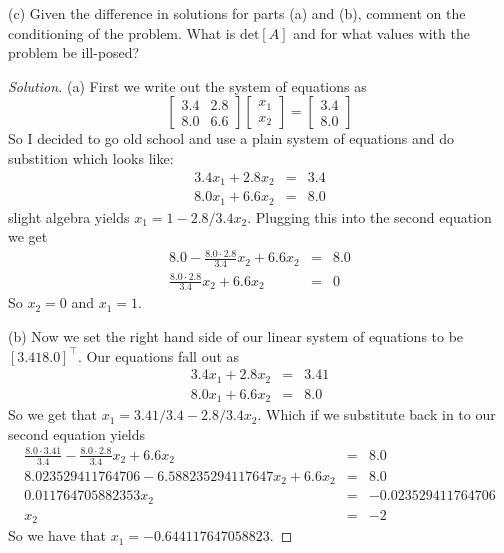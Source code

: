 \documentclass[12pt]{amsart}
\newenvironment{solution}
{\begin{proof}[Solution]}
{\end{proof}}
\begin{document}
\begin{onehalfspace}
        (c) Given the difference in solutions for parts (a) and (b), comment on the conditioning of the problem. What is
        $\text{det}[A]$ and for what values with the problem be ill-posed?
        \begin{solution}
            (a) First we write out the system of equations as
            \begin{displaymath}
                \left[\begin{matrix}
                          3.4 & 2.8 \\
                          8.0 & 6.6
                \end{matrix}\right]
                \left[\begin{matrix}
                          x_1 \\
                          x_2
                \end{matrix}\right] =
                \left[\begin{matrix}
                          3.4 \\
                          8.0
                \end{matrix}\right]
            \end{displaymath}
            So I decided to go old school and use a plain system of equations and do substition which looks like:
            \begin{eqnarray*}
                3.4x_1 + 2.8x_2 & = & 3.4 \\
                8.0x_1 + 6.6x_2 & = & 8.0
            \end{eqnarray*}
            slight algebra yields $x_1 = 1 - 2.8/3.4 x_2$. Plugging this into the second equation we get
            \begin{eqnarray*}
                8.0 - \frac{8.0\cdot 2.8}{3.4}x_2 + 6.6x_2  & = & 8.0 \\
                \frac{8.0\cdot 2.8}{3.4}x_2 + 6.6x_2 & = & 0
            \end{eqnarray*}
            So $x_2 = 0$ and $x_1 = 1$.

            (b) Now we set the right hand side of our linear system of equations to be $[3.41 8.0]^\top$. Our equations
            fall out as
            \begin{eqnarray*}
                3.4x_1 + 2.8x_2 & = & 3.41 \\
                8.0x_1 + 6.6x_2 & = & 8.0
            \end{eqnarray*}
            So we get that $x_1 = 3.41/3.4 - 2.8/3.4 x_2$. Which if we substitute back in to our second equation yields
            \begin{eqnarray*}
                \frac{8.0\cdot 3.41}{3.4} - \frac{8.0\cdot 2.8}{3.4}x_2 + 6.6x_2 & = & 8.0 \\
                8.023529411764706 - 6.588235294117647 x_2 + 6.6  x_2 & = & 8.0 \\
                0.011764705882353 x_2 & = & -0.023529411764706 \\
                x_2 & = & -2
            \end{eqnarray*}
            So we have that $x_1 = -0.644117647058823$.


\end{solution}
\end{onehalfspace}
\end{document}
